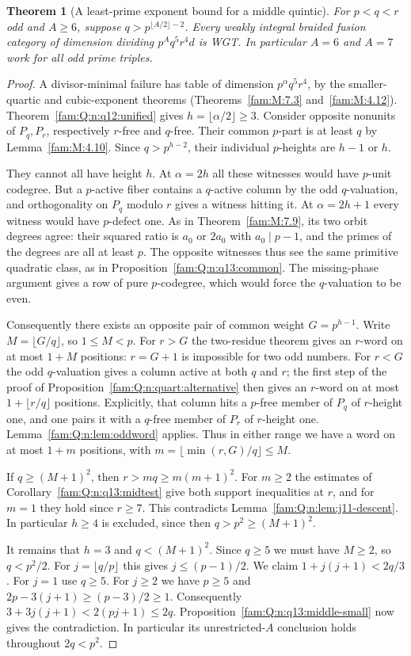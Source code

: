 \documentclass[11pt,a4paper]{article}
\numberwithin{equation}{section}
\newtheorem{theorem}{Theorem}[section]
\theoremstyle{remark}
\begin{document}
\begin{theorem}[A least-prime exponent bound for a middle quintic]\label{fam:Q:5.6}
\label{fam:Q:n:q13:middle-wide}
For $p<q<r$ odd and $A\ge6$, suppose
$q>p^{\lfloor A/2\rfloor-2}$. Every weakly integral braided
fusion category of dimension dividing $p^Aq^5r^4d$ is WGT.
In particular $A=6$ and $A=7$ work for all odd prime triples.
\end{theorem}
\begin{proof}
A divisor-minimal failure has table of dimension
$p^\alpha q^5r^4$, by the smaller-quartic and cubic-exponent
theorems (Theorems~\ref{fam:M:7.3} and~\ref{fam:M:4.12}). Theorem~\ref{fam:Q:n:q12:unified} gives
$h=\lfloor\alpha/2\rfloor\ge3$. Consider opposite nonunits of
$P_q,P_r$, respectively $r$-free and $q$-free. Their common
$p$-part is at least $q$ by Lemma~\ref{fam:M:4.10}. Since
$q>p^{h-2}$, their individual $p$-heights are $h-1$ or $h$.

They cannot all have height $h$. At $\alpha=2h$ all these
witnesses would have $p$-unit codegree. But a $p$-active fiber
contains a $q$-active column by the odd $q$-valuation, and
orthogonality on $P_q$ modulo $r$ gives a witness hitting it.
At $\alpha=2h+1$ every witness would have $p$-defect one.
As in Theorem~\ref{fam:M:7.9}, its two orbit degrees agree:
their squared ratio is $a_0$ or $2a_0$ with $a_0\mid p-1$,
and the primes of the degrees are all at least $p$. The opposite
witnesses thus see the same primitive quadratic class, as in
Proposition~\ref{fam:Q:n:q13:common}. The missing-phase argument gives
a row of pure $p$-codegree, which would force the $q$-valuation
to be even.

Consequently there exists an opposite pair of common weight
$G=p^{h-1}$. Write $M=\lfloor G/q\rfloor$, so $1\le M<p$.
For $r>G$ the two-residue theorem gives an $r$-word on at most
$1+M$ positions: $r=G+1$ is impossible for two odd numbers.
For $r<G$ the odd $q$-valuation gives a column active at both
$q$ and $r$; the first step of the proof of
Proposition~\ref{fam:Q:n:quart:alternative} then gives an $r$-word on
at most $1+\lfloor r/q\rfloor$ positions. Explicitly, that
column hits a $p$-free member of $P_q$ of $r$-height one,
and one pairs it with a $q$-free member of $P_r$ of $r$-height
one. Lemma~\ref{fam:Q:n:lem:oddword} applies. Thus in either range
we have a word on at most $1+m$ positions, with
$m=\lfloor\min(r,G)/q\rfloor\le M$.

If $q\ge(M+1)^2$, then $r>mq\ge m(m+1)^2$. For $m\ge2$ the
estimates of Corollary~\ref{fam:Q:n:q13:midtest} give both support
inequalities at $r$, and for $m=1$ they hold since $r\ge7$.
This contradicts Lemma~\ref{fam:Q:n:lem:j11-descent}. In particular
$h\ge4$ is excluded, since then $q>p^2\ge(M+1)^2$.

It remains that $h=3$ and $q<(M+1)^2$. Since $q\ge5$ we
must have $M\ge2$, so $q<p^2/2$. For $j=\lfloor q/p\rfloor$
this gives $j\le(p-1)/2$. We claim $1+j(j+1)<2q/3$.
For $j=1$ use $q\ge5$. For $j\ge2$ we have $p\ge5$ and
$2p-3(j+1)\ge(p-3)/2\ge1$. Consequently
$3+3j(j+1)<2(pj+1)\le2q$. Proposition~\ref{fam:Q:n:q13:middle-small}
now gives the contradiction. In particular its unrestricted-$A$
conclusion holds throughout $2q<p^2$.
\end{proof}
\end{document}
